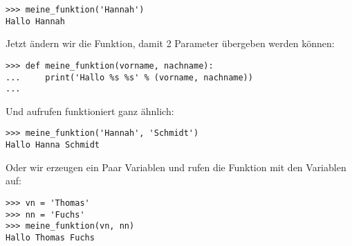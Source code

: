 \begin{Verbatim}[frame=single]
>>> meine_funktion('Hannah')
Hallo Hannah
\end{Verbatim}


\noindent
Jetzt ändern wir die Funktion, damit 2 Parameter übergeben werden können:

\begin{Verbatim}[frame=single]
>>> def meine_funktion(vorname, nachname):
...     print('Hallo %s %s' % (vorname, nachname))
...
\end{Verbatim}

\noindent
Und aufrufen funktioniert ganz ähnlich:

\begin{Verbatim}[frame=single]
>>> meine_funktion('Hannah', 'Schmidt')
Hallo Hanna Schmidt
\end{Verbatim}

\noindent
Oder wir erzeugen ein Paar Variablen und rufen die Funktion mit den Variablen auf:

\begin{Verbatim}[frame=single]
>>> vn = 'Thomas'
>>> nn = 'Fuchs'
>>> meine_funktion(vn, nn)
Hallo Thomas Fuchs
\end{Verbatim}

